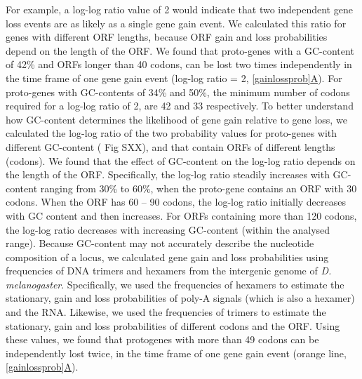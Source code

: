 \documentclass[12pt,a4paper]{article}
\newcommand{\cmnt}[1]{{\color{purple} #1}}
\begin{document}
For example, a log-log ratio value of 2 would indicate that two independent gene loss events are as likely as a single gene gain event. We calculated this ratio for genes with different ORF lengths, because ORF gain and loss probabilities depend on the length of the ORF. We found that proto-genes with a GC-content of 42\% and ORFs longer than 40 codons, can be lost two times independently in the time frame of one gene gain event (log-log ratio = 2, \hyperref[gainlossprob]{\autoref{gainlossprob}A}). For proto-genes with GC-contents of 34\% and 50\%, the minimum number of codons required for a log-log ratio of 2, are 42 and 33 respectively. To better understand how GC-content determines the likelihood of gene gain relative to gene loss, we calculated the log-log ratio of the two probability values for proto-genes with different GC-content ({\color{blue} Fig SXX}), and that contain ORFs of different lengths (codons). We found that the effect of GC-content on the log-log ratio depends on the length of the ORF. Specifically, the log-log ratio steadily increases with GC-content ranging from 30\% to 60\%, when the proto-gene contains an ORF with 30 codons. When the ORF has 60 -- 90 codons, the log-log ratio initially decreases with GC content and then increases. For ORFs containing more than 120 codons, the log-log ratio decreases with increasing GC-content (within the analysed range). \cmnt{Because GC-content may not accurately describe the nucleotide composition of a locus, we calculated gene gain and loss probabilities using frequencies of DNA trimers and hexamers from the intergenic genome of \textit{D. melanogaster}. Specifically, we used the frequencies of hexamers to estimate the stationary, gain and loss probabilities of poly-A signals (which is also a hexamer) and the RNA. Likewise, we used the frequencies of trimers to estimate the stationary, gain and loss probabilities of different codons and the ORF. Using these values, we found that protogenes with more than 49 codons can be independently lost twice, in the time frame of one gene gain event (orange line, \hyperref[gainlossprob]{\autoref{gainlossprob}A}).} 
\end{document}
